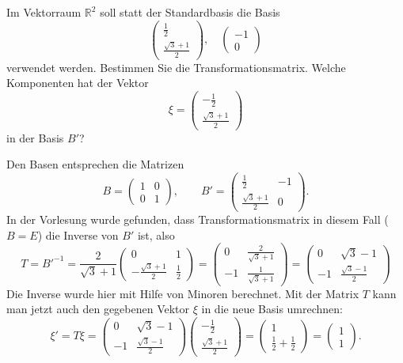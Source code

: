 Im Vektorraum $\mathbb R^2$ soll statt der Standardbasis die Basis
\[
\begin{pmatrix}
\frac12\\
\frac{\sqrt{3}+1}2
\end{pmatrix},\quad
\begin{pmatrix}
-1\\
0
\end{pmatrix}
\]
verwendet werden.
Bestimmen Sie die Transformationsmatrix.
Welche Komponenten hat der Vektor
\[
\xi=
\begin{pmatrix}
-\frac12\\
\frac{\sqrt{3}+1}2
\end{pmatrix}
\]
in der Basis $B'$?

\begin{loesung}
Den Basen entsprechen die Matrizen
\[
B=\begin{pmatrix}1&0\\0&1\end{pmatrix},\qquad
B'=\begin{pmatrix}
\frac12&-1\\
\frac{\sqrt{3}+1}2&0
\end{pmatrix}.
\]
In der Vorlesung wurde gefunden, dass Transformationsmatrix in diesem
Fall ($B=E$) die Inverse von $B'$ ist, also
\[
T=B'^{-1}=\frac2{\sqrt{3}+1}\begin{pmatrix}
0&1\\
-\frac{\sqrt{3}+1}2&\frac12
\end{pmatrix}
=\begin{pmatrix}
0&\frac{2}{\sqrt{3}+1}\\
-1&\frac1{\sqrt{3}+1}
\end{pmatrix}
=
\begin{pmatrix}
0&\sqrt{3}-1\\
-1&\frac{\sqrt{3}-1}{2}
\end{pmatrix}
\]
Die Inverse wurde hier mit Hilfe von Minoren berechnet.
Mit der Matrix $T$ kann man jetzt auch den gegebenen Vektor $\xi$  in
die neue Basis umrechnen:
\[
\xi'=
T\xi
=
\begin{pmatrix}
0&\sqrt{3}-1\\
-1&\frac{\sqrt{3}-1}{2}
\end{pmatrix}
\begin{pmatrix}
-\frac12\\
\frac{\sqrt{3}+1}2
\end{pmatrix}
=
\begin{pmatrix}1\\
\frac12+\frac12\end{pmatrix}
=\begin{pmatrix}1\\1\end{pmatrix}.
\]
\end{loesung}


